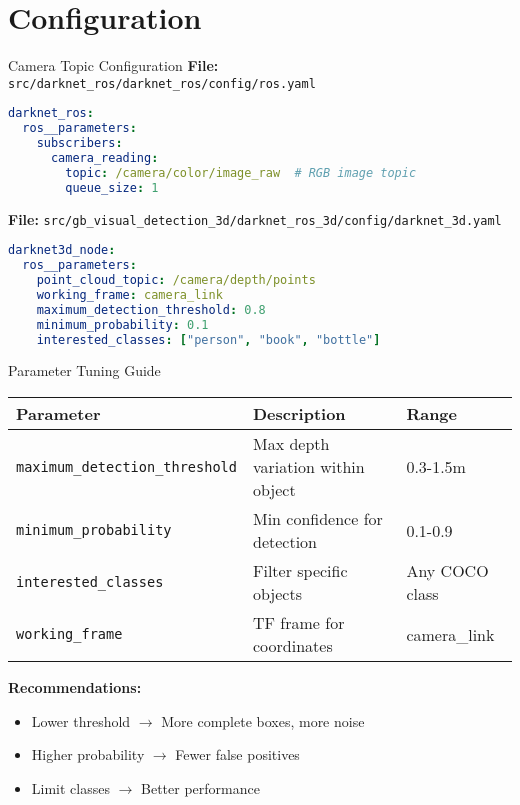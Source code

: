 \documentclass[aspectratio=169]{beamer}
\begin{document}
\section{Configuration}

\begin{frame}[fragile]{Camera Topic Configuration}
\textbf{File:} \texttt{src/darknet\_ros/darknet\_ros/config/ros.yaml}

\begin{lstlisting}[language=yaml, basicstyle=\tiny\ttfamily]
darknet_ros:
  ros__parameters:
    subscribers:
      camera_reading:
        topic: /camera/color/image_raw  # RGB image topic
        queue_size: 1
\end{lstlisting}

\vspace{1em}
\textbf{File:} \texttt{src/gb\_visual\_detection\_3d/darknet\_ros\_3d/config/darknet\_3d.yaml}

\begin{lstlisting}[language=yaml, basicstyle=\tiny\ttfamily]
darknet3d_node:
  ros__parameters:
    point_cloud_topic: /camera/depth/points
    working_frame: camera_link
    maximum_detection_threshold: 0.8
    minimum_probability: 0.1
    interested_classes: ["person", "book", "bottle"]
\end{lstlisting}
\end{frame}

\begin{frame}{Parameter Tuning Guide}
\begin{table}
\begin{tabular}{|l|p{5cm}|l|}
\hline
\textbf{Parameter} & \textbf{Description} & \textbf{Range} \\
\hline
\texttt{maximum\_detection\_threshold} & Max depth variation within object & 0.3-1.5m \\
\hline
\texttt{minimum\_probability} & Min confidence for detection & 0.1-0.9 \\
\hline
\texttt{interested\_classes} & Filter specific objects & Any COCO class \\
\hline
\texttt{working\_frame} & TF frame for coordinates & camera\_link \\
\hline
\end{tabular}
\end{table}

\vspace{1em}
\textbf{Recommendations:}
\begin{itemize}
    \item Lower threshold $\rightarrow$ More complete boxes, more noise
    \item Higher probability $\rightarrow$ Fewer false positives
    \item Limit classes $\rightarrow$ Better performance
\end{itemize}
\end{frame}
\end{document}
